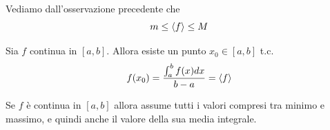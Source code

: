 \begin{osservazione}
    Vediamo dall'osservazione precedente che
    \begin{equation}
        m\leq \left\langle{f}\right\rangle\leq M
    \end{equation}
\end{osservazione}

\begin{teorema}
    Sia $f$ continua in $[a,b]$. Allora esiste un punto $x_0\in [a,b]$ t.c.
    \begin{equation}
        f(x_0)=\frac{\int_{a}^{b} f(x) dx}{b-a}=\left\langle{f}\right\rangle
    \end{equation}
\end{teorema}

\begin{osservazione}
    Se $f$ è continua in $[a,b]$ allora assume tutti i valori compresi tra minimo e massimo, e quindi anche il valore della sua media integrale.
\end{osservazione}





